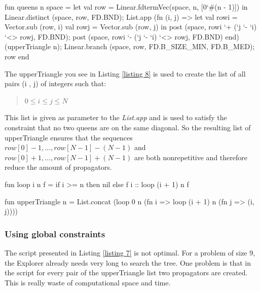 \documentclass[a4paper,halfparskip]{scrartcl}
\begin{document}
\begin{myverbatim}
fun queens n space =
   let
      val row = Linear.fdtermVec(space, n, [0`#(n - 1)])
   in
      Linear.distinct (space, row, FD.BND);
      List.app (fn (i, j) =>
         let
            val rowi = Vector.sub (row, i)
            val rowj = Vector.sub (row, j)
         in
            post (space, rowi `+ (`j `- `i) `<> rowj, FD.BND);
            post (space, rowi `- (`j `- `i) `<> rowj, FD.BND)
         end) (upperTriangle n);
      Linear.branch (space, row, FD.B_SIZE_MIN, FD.B_MED);
      row
   end
\end{myverbatim}



The  upperTriangle you see in Listing \ref{listing 8} is used
to create the list of all pairs (i , j) of integers such that:
\begin{quote}
$ 0 \leq i \le j \le N $
\end{quote}  
This list is given as parameter to the \emph{List.app}  and
is used to satisfy the constraint that no two queens are on the
same diagonal. So the resulting list of upperTriangle ensures
that the sequences $ row[ 0 ] - 1, \ldots, row[ N - 1 ] - (N - 1)  $ and
$ row[ 0 ] + 1, \ldots, row[ N - 1] + (N - 1) $ are both
nonrepetitive and therefore reduce the amount of propagators.
\begin{myverbatim}
fun loop i n f = if i >= n then nil else f i :: loop (i + 1) n f

fun upperTriangle n =
   List.concat (loop 0 n 
               (fn i => loop (i + 1) n (fn j => (i, j))))

\end{myverbatim}

\subsubsection{Using global constraints}
The script presented in Listing \ref{listing 7} is not optimal.
For a problem of size 9, the Explorer already needs very long to
search the tree. One problem is that in the script for every
pair of the upperTriangle list two propagators are created. This
is really waste of computational space and time.
\end{document}
